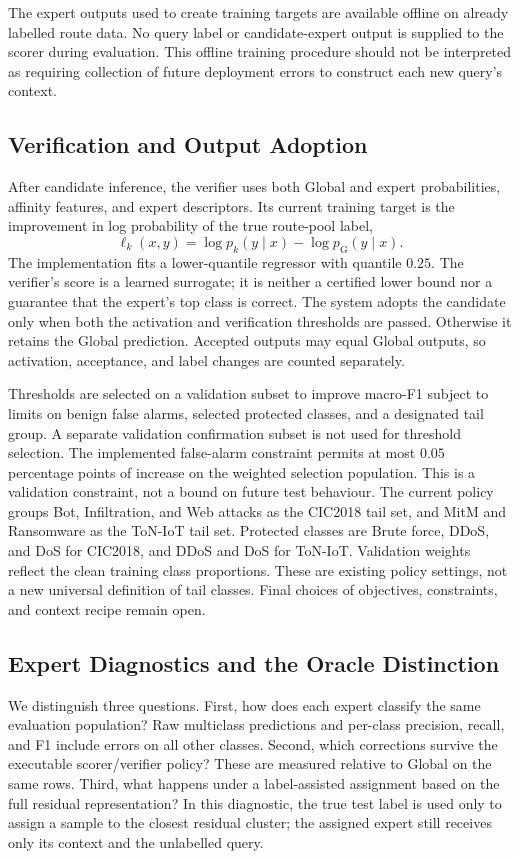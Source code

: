 \documentclass[sigconf,anonymous,pbalance]{acmart}
\newcommand{\globalidx}{\mathrm{G}}
\begin{document}
The expert outputs used to create training targets are available offline on already labelled route data. No query label or candidate-expert output is supplied to the scorer during evaluation. This offline training procedure should not be interpreted as requiring collection of future deployment errors to construct each new query's context.

\subsection{Verification and Output Adoption}
After candidate inference, the verifier uses both Global and expert probabilities, affinity features, and expert descriptors. Its current training target is the improvement in log probability of the true route-pool label,
\begin{equation}
 \ell_k(x,y)=\log p_k(y\mid x)-\log p_{\globalidx}(y\mid x).
\end{equation}
The implementation fits a lower-quantile regressor with quantile $0.25$. The verifier's score is a learned surrogate; it is neither a certified lower bound nor a guarantee that the expert's top class is correct. The system adopts the candidate only when both the activation and verification thresholds are passed. Otherwise it retains the Global prediction. Accepted outputs may equal Global outputs, so activation, acceptance, and label changes are counted separately.

Thresholds are selected on a validation subset to improve macro-F1 subject to limits on benign false alarms, selected protected classes, and a designated tail group. A separate validation confirmation subset is not used for threshold selection. The implemented false-alarm constraint permits at most $0.05$ percentage points of increase on the weighted selection population. This is a validation constraint, not a bound on future test behaviour. The current policy groups Bot, Infiltration, and Web attacks as the CIC2018 tail set, and MitM and Ransomware as the ToN-IoT tail set. Protected classes are Brute force, DDoS, and DoS for CIC2018, and DDoS and DoS for ToN-IoT. Validation weights reflect the clean training class proportions. These are existing policy settings, not a new universal definition of tail classes. Final choices of objectives, constraints, and context recipe remain open.

\subsection{Expert Diagnostics and the Oracle Distinction}
\label{sec:diagnostics}
We distinguish three questions. First, how does each expert classify the same evaluation population? Raw multiclass predictions and per-class precision, recall, and F1 include errors on all other classes. Second, which corrections survive the executable scorer/verifier policy? These are measured relative to Global on the same rows. Third, what happens under a label-assisted assignment based on the full residual representation? In this diagnostic, the true test label is used only to assign a sample to the closest residual cluster; the assigned expert still receives only its context and the unlabelled query.
\end{document}

